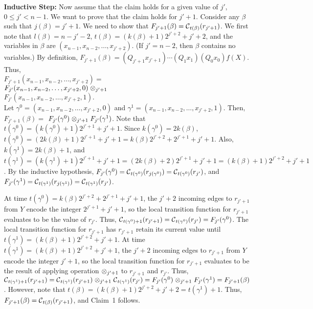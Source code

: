 \smallskip
\noindent
{\bf Inductive Step:} 
Now assume that the claim holds for a given value of $j'$, $0 \leq j' < n-1$.
We want to prove that the claim holds for $j'+1$.
Consider any $\beta$ such that $j(\beta) = j'+1$.
We need to show that $F_{j'+1}(\beta) = \mbox{$\mathcal{C}$}_{t(\beta)}(r_{j'+1})$.
We first note that $l(\beta) = n-j'-2$, 
$t(\beta) = (k(\beta) + 1)2^{j'+2}+j'+2$,
and the variables in $\beta$ are $(x_{n-1}, x_{n-2}, \ldots , x_{j'+2})$.
(If $j' = n-2$, then $\beta$ contains no variables.)
By definition, 
$F_{j'+1}(\beta) =  (Q_{j'+1} x_{j'+1}) \cdots (Q_1 x_1) (Q_0 x_0) f(X)$.
Thus,\\
$F_{j'+1}(x_{n-1}, x_{n-2}, \ldots , x_{j'+2}) = $\\
\hspace*{0.1in}
$F_{j'}(x_{n-1}, x_{n-2}, \ldots , x_{j'+2}, 0) \; \mbox{$\otimes$}_{j'+1} \;$\\
\hspace*{0.2in} $F_{j'}(x_{n-1}, x_{n-2}, \ldots , x_{j'+2}, 1).$\\
Let $\gamma^0 = (x_{n-1}, x_{n-2}, \ldots , x_{j'+2}, 0)$
and $\gamma^1 = (x_{n-1}, x_{n-2}, \ldots , x_{j'+2}, 1)$.
Then, $F_{j'+1}(\beta) =$  
$F_{j'}(\gamma^0) \; \mbox{$\otimes$}_{j'+1} \; F_{j'}(\gamma^1)$.
Note that
$t(\gamma^0) = (k(\gamma^0)+1)2^{j'+1}+j'+1$.
Since $k(\gamma^0)= 2k(\beta)$,
$t(\gamma^0) = (2k(\beta)+1)2^{j'+1}+j'+1 = k(\beta)2^{j'+2}+2^{j'+1}+j'+1$.
Also, $k(\gamma^1)= 2k(\beta)+1$, and
$t(\gamma^1) = (k(\gamma^1)+1)2^{j'+1}+j'+1= 
(2k(\beta)+2)2^{j'+1}+j'+1 =  (k(\beta)+1)2^{j'+2}+j'+1$.
By the inductive hypothesis,
$F_{j'}(\gamma^0) = \mbox{$\mathcal{C}$}_{t(\gamma^0)}(r_{j(\gamma^0)}) 
= \mbox{$\mathcal{C}$}_{t(\gamma^0)}(r_{j'})$,
and $F_{j'}(\gamma^1) = \mbox{$\mathcal{C}$}_{t(\gamma^1)}(r_{j(\gamma^1)}) 
= \mbox{$\mathcal{C}$}_{t(\gamma^1)}(r_{j'})$.

At time $t(\gamma^0) = k(\beta)2^{j'+2}+2^{j'+1}+j'+1$,
the $j'+2$ incoming edges to $r_{j'+1}$ from $Y$ encode the integer $2^{j'+1}+j'+1$,
so the local transition function for $r_{j'+1}$ evaluates to be the value of $r_{j'}$.
Thus, $\mbox{$\mathcal{C}$}_{t(\gamma^0)+1}(r_{j'+1}) = \mbox{$\mathcal{C}$}_{t(\gamma^0)}(r_{j'}) = F_{j'}(\gamma^0)$.
The local transition function for $r_{j'+1}$ has $r_{j'+1}$ retain its current value until 
$t(\gamma^1) = (k(\beta)+1)2^{j'+2}+j'+1$.
At time $t(\gamma^1) =  (k(\beta)+1)2^{j'+2}+j'+1$,
the $j'+2$ incoming edges to $r_{j'+1}$ from $Y$ encode the integer $j'+1$,
so the local transition function for $r_{j'+1}$ evaluates to be the result
of applying operation $\mbox{$\otimes$}_{j'+1}$ to  $r_{j'+1}$ and $r_{j'}$.
Thus, 
$\mbox{$\mathcal{C}$}_{t(\gamma^1)+1}(r_{j'+1}) = 
 \mbox{$\mathcal{C}$}_{t(\gamma^1)}(r_{j'+1})  \; \mbox{$\otimes$}_{j'+1} \; \mbox{$\mathcal{C}$}_{t(\gamma^1)}(r_{j'}) 
= F_{j'}(\gamma^0)  \; \mbox{$\otimes$}_{j'+1} \; F_{j'}(\gamma^1) = F_{j'+1}(\beta)$.
However, note that $t(\beta) = (k(\beta) + 1)2^{j'+2}+j'+2 =  t(\gamma^1)+1$.
Thus, $F_{j'+1}(\beta) = \mbox{$\mathcal{C}$}_{t(\beta)}(r_{j'+1})$, and
Claim~1 follows. 

